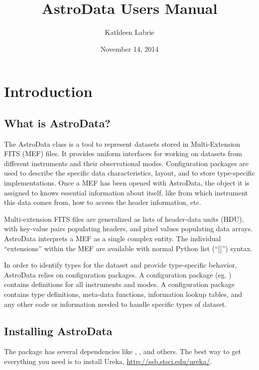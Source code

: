 \documentclass[letterpaper,10pt,english]{sphinxmanual}
\title{AstroData Users Manual}
\date{November 14, 2014}
\author{Kathleen Labrie}
\begin{document}
\maketitle
\tableofcontents
{}\label{index-latex::doc}



\chapter{Introduction}
\label{intro:introduction}\label{intro:intro}\label{intro::doc}\label{intro:astrodata-user-s-manual}

\section{What is AstroData?}
\label{intro:what-is-astrodata}
The AstroData class is a tool to represent datasets stored in
Multi-Extension FITS (MEF) files. It provides uniform interfaces for
working on datasets from different instruments and their observational modes.
Configuration packages are used to describe the specific data characteristics,
layout, and to store type-specific implementations.  Once a MEF has been
opened with AstroData, the object it is assigned to knows essential information
about itself, like from which instrument this data comes from, how to access
the header information, etc.

Multi-extension FITS files are generalized as lists of header-data units
(HDU), with key-value pairs populating headers, and pixel values populating
data arrays. AstroData interprets a MEF as a single complex entity.  The
individual ``extensions'' within the MEF are available with normal Python list
(``{[}{]}'') syntax.

In order to identify types for the dataset and provide type-specific behavior,
AstroData relies on configuration packages.  A configuration package (eg.
) contains definitions for all instruments and modes. A
configuration package contains type definitions, meta-data functions,
information lookup tables, and any other code or information needed to handle
specific types of dataset.


\section{Installing AstroData}
\label{intro:installing-astrodata}\label{intro:install}
The  package has several dependencies like , , and others.
The best way to get everything you need is to install Ureka, \href{http://ssb.stsci.edu/ureka/}{http://ssb.stsci.edu/ureka/}.
\end{document}

